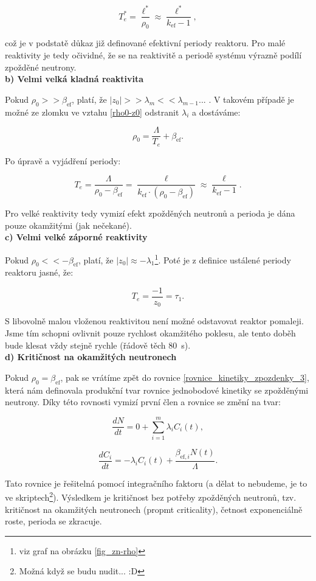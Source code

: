 $$ T_e^* = \dfrac{\ell^*}{\rho_0} \approx \dfrac{\ell^*}{k_{\text{ef}}-1}, $$

což je v podstatě důkaz již definované efektivní periody reaktoru. Pro malé reaktivity je tedy očividné, že se na reaktivitě a periodě systému výrazně podílí zpožděné neutrony.\\

\textbf{b) Velmi velká kladná reaktivita}

Pokud $\rho_0 >> \beta_{\text{ef}}$, platí, že $|z_0| >> \lambda_m << \lambda_{m-1} ...$ . V takovém případě je možné ze zlomku ve vztahu \eqref{rho0-z0} odstranit $\lambda_i$ a dostáváme:

$$ \rho_0 = \dfrac{\Lambda}{T_e} + \beta_{\text{ef}}. $$

Po úpravě a vyjádření periody:

$$ T_e = \dfrac{\Lambda}{\rho_0 - \beta_{\text{ef}}} = \dfrac{\ell}{k_{\text{ef}} \cdot (\rho_0 - \beta_{\text{ef}})} \approx \dfrac{\ell}{k_{\text{ef}}-1}. $$

Pro velké reaktivity tedy vymizí efekt zpožděných neutronů a perioda je dána pouze okamžitými (jak nečekané).\\

\textbf{c) Velmi velké záporné reaktivity}

Pokud $\rho_0 << -\beta_{\text{ef}}$, platí, že $|z_0| \approx -\lambda_1$\footnote{viz graf na obrázku \ref{fig_zn-rho}}. Poté je z definice ustálené periody reaktoru jasné, že:

$$ T_e = \dfrac{-1}{z_0} = \tau_1. $$

S libovolně malou vloženou reaktivitou není možné odstavovat reaktor pomaleji. Jsme tím schopni ovlivnit pouze rychlost okamžitého poklesu, ale tento doběh bude klesat vždy stejně rychle (řádově těch 80~s).\\

\textbf{d) Kritičnost na okamžitých neutronech}

Pokud $\rho_0 = \beta_{\text{ef}}$, pak se vrátíme zpět do rovnice \eqref{rovnice_kinetiky_zpozdenky_3}, která nám definovala produkční tvar rovnice jednobodové kinetiky se zpožděnými neutrony. Díky této rovnosti vymizí první člen a rovnice se změní na tvar:

$$ \dfrac{dN}{dt} = 0 + \sum_{i=1}^m \lambda_i C_i(t), $$

$$ \dfrac{dC_i}{dt} = -\lambda_i C_i(t) + \dfrac{\beta_{\text{ef},i}  N(t)}{\Lambda}. $$

Tato rovnice je řešitelná pomocí integračního faktoru (a dělat to nebudeme, je to ve skriptech\footnote{Možná když se budu nudit... :D}). Výsledkem je kritičnost bez potřeby zpožděných neutronů, tzv. kritičnost na okamžitých neutronech (propmt criticality), četnost exponenciálně roste, perioda se zkracuje.

